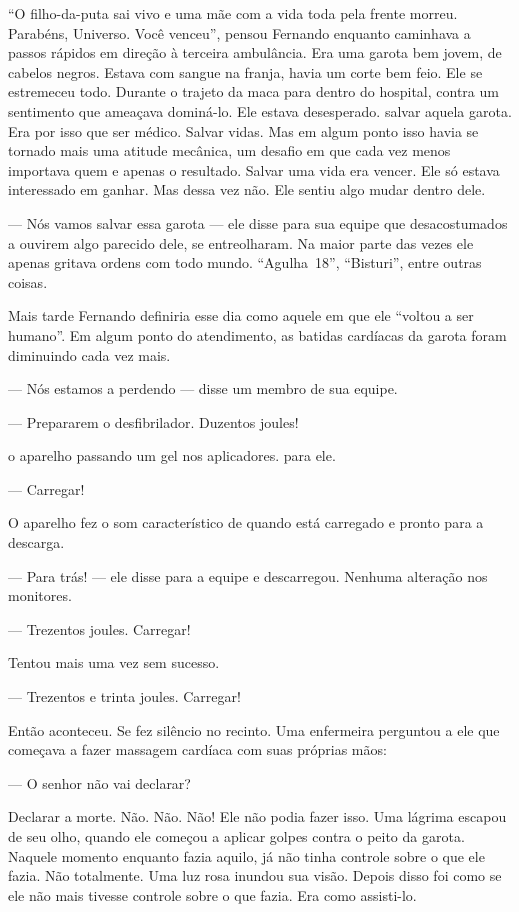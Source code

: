 ``O filho-da-puta sai vivo e uma mãe com a vida toda pela frente morreu. Parabéns, Universo. Você venceu'', pensou Fernando enquanto caminhava a passos rápidos em direção à terceira ambulância. Era uma garota bem jovem, de cabelos negros. Estava com sangue na franja, havia um corte bem feio. Ele se estremeceu todo. Durante o trajeto da maca para dentro do hospital,  contra um sentimento que ameaçava dominá-lo. Ele estava desesperado.  salvar aquela garota. Era por isso que  ser médico. Salvar vidas. Mas em algum ponto isso havia se tornado mais uma atitude mecânica, um desafio em que cada vez menos importava quem e apenas o resultado. Salvar uma vida era vencer. Ele só estava interessado em ganhar. Mas dessa vez não. Ele sentiu algo mudar dentro dele.

--- Nós vamos salvar essa garota ---  ele disse para sua equipe que\mudanca{,} desacostumados a ouvirem algo parecido dele, se entreolharam. Na maior parte das vezes ele apenas gritava ordens com todo mundo. ``Agulha~18'', ``Bisturi'', entre outras coisas.

Mais tarde\mudanca{,} Fernando definiria esse dia como aquele em que ele ``voltou a ser humano''.  Em algum ponto do atendimento, as batidas cardíacas da garota foram diminuindo cada vez mais.

--- Nós estamos a perdendo --- disse um membro de sua equipe.

--- Prepararem o desfibrilador. Duzentos joules!

 o aparelho passando um gel nos aplicadores.  para ele.

--- Carregar!

O aparelho fez o som característico de quando está carregado e pronto para a descarga.

--- Para trás! --- ele disse para a equipe e descarregou. Nenhuma alteração nos monitores.

--- Trezentos joules. Carregar!

Tentou mais uma vez\mudanca{,} sem sucesso.

--- Trezentos e trinta joules. Carregar!

Então  aconteceu. Se fez silêncio no recinto. Uma enfermeira perguntou a ele\mudanca{,} que começava a fazer massagem cardíaca com suas próprias mãos:

--- O senhor não vai declarar?

Declarar a morte. Não. Não. Não! Ele não podia fazer isso. Uma lágrima escapou de seu olho, quando ele começou a aplicar golpes contra o peito da garota. Naquele momento\mudanca{,} enquanto fazia aquilo, já não tinha controle sobre o que ele fazia. Não totalmente. Uma luz rosa inundou sua visão. Depois disso foi como se ele não mais tivesse controle sobre o que fazia. Era como assisti-lo.

